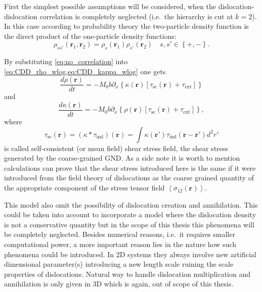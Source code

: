 First the simplest possible assumptions will be considered, when the dislocation-dislocation correlation is completely neglected (i.e.\ the hierarchy is cut at $k=2$). In this case according to probability theory the two-particle density function is the direct product of the one-particle density functions:
\begin{equation} \label{eq:no_correlation}
{\rho _{ss'}}\left( {{{\mathbf{r}}_1},{{\mathbf{r}}_2}} \right) = {\rho _s}\left( {{{\mathbf{r}}_1}} \right){\rho _{s'}}\left( {{{\mathbf{r}}_2}} \right)\quad s,s' \in \left\{ { + , - } \right\}.
\end{equation}

By substituting \cref{eq:no_correlation} into \cref{eq:CDD_rho_wlog,eq:CDD_kappa_wlog} one gets
\begin{equation} \label{eq:EOM_no_correlation_rho}
\frac{{d\rho \left( {\mathbf{r}} \right)}}{{dt}} =  - {M_0}b{\partial _x}\left\{ {\kappa \left( {\mathbf{r}} \right)\left[ {{\tau _{{\text{sc}}}}\left( {\mathbf{r}} \right) + {\tau _{{\text{ext}}}}} \right]} \right\}
\end{equation}
and
\begin{equation} \label{eq:EOM_no_correlation_kappa}
\frac{{d\kappa \left( {\mathbf{r}} \right)}}{{dt}} =  - {M_0}b{\partial _x}\left\{ {\rho \left( {\mathbf{r}} \right)\left[ {{\tau _{{\text{sc}}}}\left( {\mathbf{r}} \right) + {\tau _{{\text{ext}}}}} \right]} \right\},
\end{equation}
where
\begin{equation} \label{eq:disloc_int_force}
{\tau _{{\text{sc}}}}\left( {\mathbf{r}} \right) = \left( {\kappa  * {\tau _{{\text{ind}}}}} \right)\left( {\mathbf{r}} \right) = \int {\kappa \left( {{\mathbf{r}}'} \right){\tau _{{\text{ind}}}}\left( {{\mathbf{r}} - {\mathbf{r}}'} \right){d^2}r'}
\end{equation}
is called self-consistent (or mean field) shear stress field, the shear stress generated by the coarse-grained GND. As a side note it is worth to mention calculations can prove that the shear stress introduced here is the same if it were introduced from the field theory of dislocations as the coarse grained quantity of the appropriate component of the stress tensor field $\left\langle {{\sigma _{12}}\left( {\mathbf{r}} \right)} \right\rangle $.

This model also omit the possibility of dislocation creation and annihilation. This could be taken into account to incorporate a model where the dislocation density is not a conservative quantity but in the scope of this thesis this phenomena will be completely neglected. Besides numerical reasons, i.e.\ it requires smaller computational power, a more important reason lies in the nature how such phenomena could be introduced. In 2D systems they always involve new artificial dimensional parameter(s) introducing a new length scale ruining the scale properties of dislocations\cite{0965-0393-22-6-065012}. Natural way to handle dislocation multiplication and annihilation is only given in 3D which is again, out of scope of this thesis.

